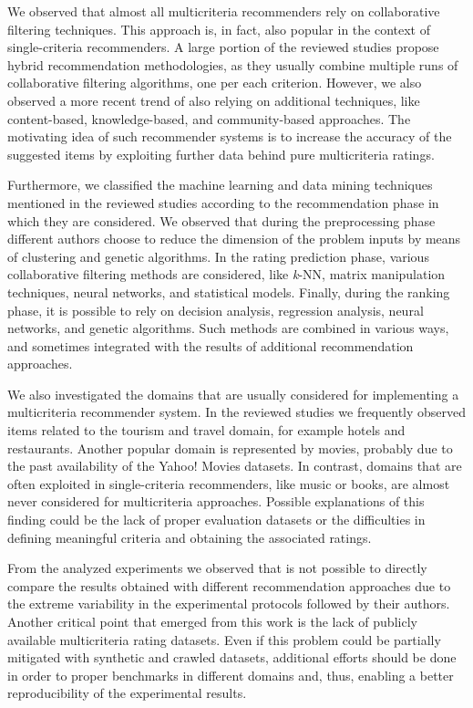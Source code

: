 We observed that almost all multicriteria recommenders rely on collaborative filtering techniques. This approach is, in fact, also popular in the context of single-criteria recommenders. A large portion of the reviewed studies propose hybrid recommendation methodologies, as they usually combine multiple runs of collaborative filtering algorithms, one per each criterion. However, we also observed a more recent trend of also relying on additional techniques, like content-based, knowledge-based, and community-based approaches. The motivating idea of such recommender systems is to increase the accuracy of the suggested items by exploiting further data behind pure multicriteria ratings.

Furthermore, we classified the machine learning and data mining techniques mentioned in the reviewed studies according to the recommendation phase in which they are considered. We observed that during the preprocessing phase different authors choose to reduce the dimension of the problem inputs by means of clustering and genetic algorithms. In the rating prediction phase, various collaborative filtering methods are considered, like \textit{k}-NN, matrix manipulation techniques, neural networks, and statistical models. Finally, during the ranking phase, it is possible to rely on decision analysis, regression analysis, neural networks, and genetic algorithms. Such methods are combined in various ways, and sometimes integrated with the results of additional recommendation approaches.

We also investigated the domains that are usually considered for implementing a multicriteria recommender system. In the reviewed studies we frequently observed items related to the tourism and travel domain, for example hotels and restaurants. Another popular domain is represented by movies, probably due to the past availability of the Yahoo! Movies datasets. In contrast, domains that are often exploited in single-criteria recommenders, like music or books, are almost never considered for multicriteria approaches. Possible explanations of this finding could be the lack of proper evaluation datasets or the difficulties in defining meaningful criteria and obtaining the associated ratings.

From the analyzed experiments we observed that  is not possible to directly compare the results obtained with different recommendation approaches due to the extreme variability in the experimental protocols followed by their authors. Another critical point that emerged from this work is the lack of publicly available multicriteria rating datasets. Even if this problem could be partially mitigated with synthetic and crawled datasets, additional efforts should be done in order to  proper benchmarks in different domains and, thus, enabling a better reproducibility of the experimental results.

